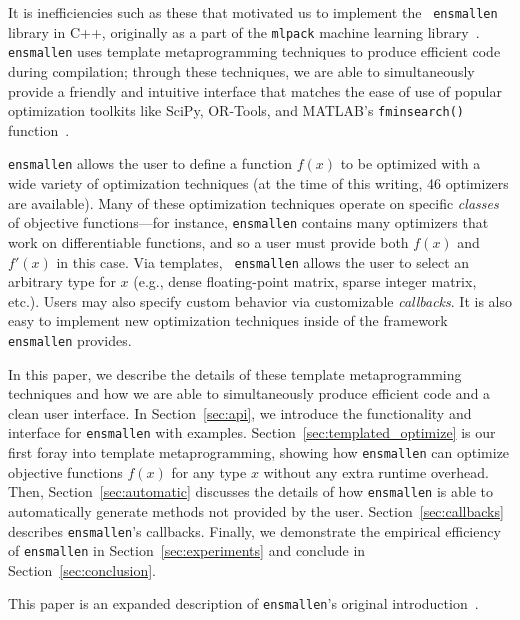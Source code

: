It is inefficiencies such as these that motivated us to implement the {\tt
ensmallen} library in C++, originally as a part of the {\tt mlpack} machine
learning library~\cite{mlpack2018}.  {\tt ensmallen} uses template
metaprogramming techniques to produce efficient code during compilation; through
these techniques, we are able to simultaneously provide a friendly and intuitive
interface that matches the ease of use of popular optimization toolkits like
SciPy, OR-Tools, and MATLAB's {\tt fminsearch()}
function~\cite{matlab_fminsearch}.

{\tt ensmallen} allows the user to define a function $f(x)$ to be optimized with
a wide variety of optimization techniques (at the time of this writing, 46
optimizers are available).  Many of these optimization techniques operate on
specific {\it classes} of objective functions---for instance, {\tt ensmallen}
contains many optimizers that work on differentiable functions, and so a user
must provide both $f(x)$ and $f'(x)$ in this case.  Via templates, {\tt
ensmallen} allows the user to select an arbitrary type for $x$ (e.g., dense
floating-point matrix, sparse integer matrix, etc.).  Users may also specify
custom behavior via customizable {\it callbacks}.  It is also easy to implement
new optimization techniques inside of the framework {\tt ensmallen} provides.

In this paper, we describe the details of these template metaprogramming
techniques and how we are able to simultaneously produce efficient code and a
clean user interface.  In Section~\ref{sec:api}, we introduce the functionality
and interface for {\tt ensmallen} with examples.
Section~\ref{sec:templated_optimize} is our first foray into template
metaprogramming, showing how {\tt ensmallen} can optimize objective functions
$f(x)$ for any type $x$ without any extra runtime overhead.  Then,
Section~\ref{sec:automatic} discusses the details of how {\tt ensmallen} is able
to automatically generate methods not provided by the user.
Section~\ref{sec:callbacks} describes {\tt ensmallen}'s callbacks.
Finally, we demonstrate the empirical efficiency of {\tt ensmallen} in
Section~\ref{sec:experiments} and conclude in Section~\ref{sec:conclusion}.

This paper is an expanded description of {\tt ensmallen}'s original
introduction~\cite{ensmallen2018, curtin2017generic}.
